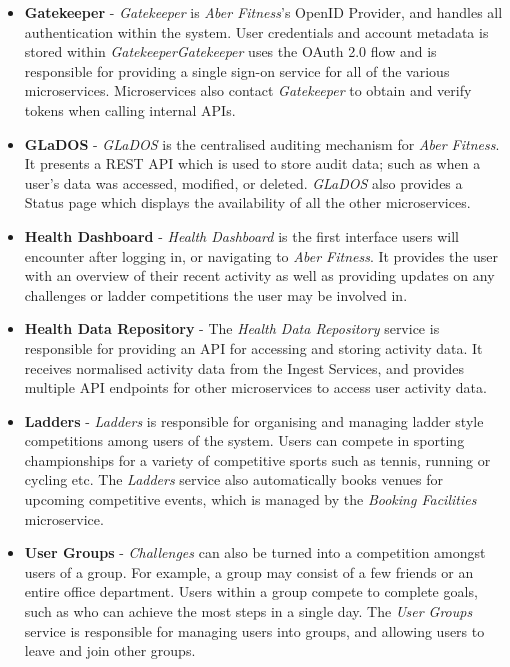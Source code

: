 \begin{itemize}
	\item \textbf{Gatekeeper} - \textit{Gatekeeper} is \textit{Aber Fitness}'s OpenID Provider, and handles all authentication within the system. User credentials and account metadata is stored within \textit{Gatekeeper}\textit{Gatekeeper} uses the OAuth 2.0 flow and is responsible for providing a single sign-on service for all of the various microservices. Microservices also contact \textit{Gatekeeper} to obtain and verify tokens when calling internal APIs.

	\item \textbf{GLaDOS} - \textit{GLaDOS} is the centralised auditing mechanism for \textit{Aber Fitness}. It presents a REST API which is used to store audit data; such as when a user's data was accessed, modified, or deleted. \textit{GLaDOS} also provides a Status page which displays the availability of all the other microservices.

	\item \textbf{Health Dashboard} - \textit{Health Dashboard} is the first interface users will encounter after logging in, or navigating to \textit{Aber Fitness}.  It provides the user with an overview of their recent activity as well as providing updates on any challenges or ladder competitions the user may be involved in.

	\item \textbf{Health Data Repository} - The \textit{Health Data Repository} service is responsible for providing an API for accessing and storing activity data. It receives normalised activity data from the Ingest Services, and provides multiple API endpoints for other microservices to access user activity data. 

	\item \textbf{Ladders} - \textit{Ladders} is responsible for organising and managing ladder style competitions among users of the system. Users can compete in sporting championships for a variety of competitive sports such as tennis, running or cycling etc. The \textit{Ladders} service also automatically books venues for upcoming competitive events, which is managed by the \textit{Booking Facilities} microservice.

	\item \textbf{User Groups} - \textit{Challenges} can also be turned into a competition amongst users of a group. For example, a group may consist of a few friends or an entire office department. Users within a group compete to complete goals, such as who can achieve the most steps in a single day. The \textit{User Groups} service is responsible for managing users into groups, and allowing users to leave and join other groups.

\end{itemize}